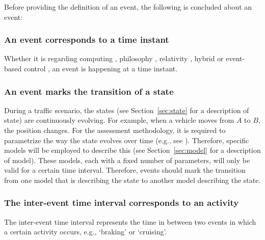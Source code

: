 Before providing the definition of an event, the following is concluded about an event:

\subsubsection{An event corresponds to a time instant}
Whether it is regarding computing \cite{breu1997towards}, philosophy \cite{kim1993supervenience}, relativity \cite{sartori1996understanding}, hybrid or event-based control \cite{branicky1998hybridcontrol, boel1999hybridcontrol, heemels2012eventcontrol}, an event is happening at a time instant.

\subsubsection{An event marks the transition of a state}
During a traffic scenario, the states (see Section~\ref{sec:state} for a description of state) are continuously evolving. For example, when a vehicle moves from $A$ to $B$, the position changes. For the assessment methodology, it is required to parametrize the way the state evolves over time (e.g., see \cite{deGelder2017assessment}). Therefore, specific models will be employed to describe this (see Section~\ref{sec:model} for a description of model). These models, each with a fixed number of parameters, will only be valid for a certain time interval. Therefore, events should mark the transition from one model that is describing the state to another model describing the state.

\subsubsection{The inter-event time interval corresponds to an activity}
The inter-event time interval represents the time in between two events in which a certain activity occurs, e.g., `braking' or `cruising'.



